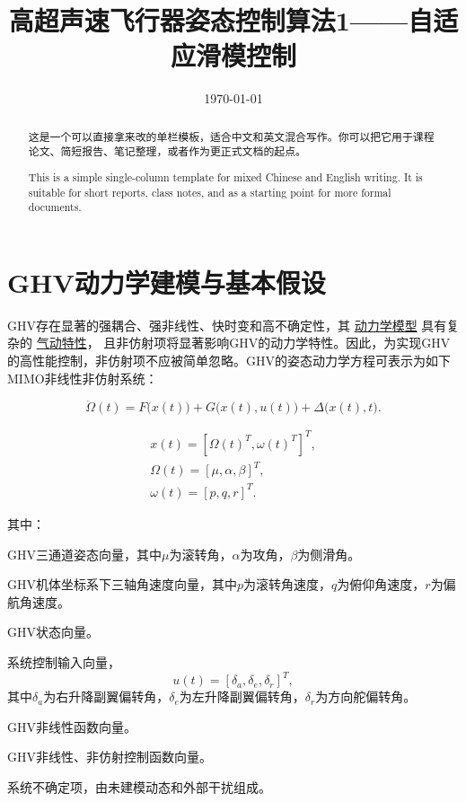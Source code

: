 \documentclass[11pt,a4paper,UTF8]{ctexart}
\title{高超声速飞行器姿态控制算法1——自适应滑模控制}
\author{}
\date{\today}
\begin{document}
\maketitle

\begin{abstract}
  这是一个可以直接拿来改的单栏模板，适合中文和英文混合写作。你可以把它用于课程论文、简短报告、笔记整理，或者作为更正式文档的起点。
  
  This is a simple single-column template for mixed Chinese and English writing. It is suitable for short reports, class notes, and as a starting point for more formal documents.
\end{abstract}
  
\tableofcontents
\newpage


\section{GHV动力学建模与基本假设}

GHV存在显著的强耦合、强非线性、快时变和高不确定性，其
\href{./docs/Hypersonic\%20vehicle\%20simulation\%20model\%20Winged-cone\%20configuration.pdf}{动力学模型}
具有复杂的
\href{./docs/Development\%20of\%20an\%20Aerodynamic\%20Database\%20for\%20a\%20generic\%20Hypersonic\%20Air\%20Vehicle.pdf}{气动特性}，
且非仿射项将显著影响GHV的动力学特性。因此，为实现GHV的高性能控制，非仿射项不应被简单忽略。GHV的姿态动力学方程可表示为如下MIMO非线性非仿射系统：

\begin{equation}
  \ddot{\Omega}(t)
  =F\bigl(x(t)\bigr)+G\bigl(x(t),u(t)\bigr)+\Delta\bigl(x(t),t\bigr).
\end{equation}

\begin{equation}
\begin{gathered}
  x(t)=\left[\Omega(t)^{T},\omega(t)^{T}\right]^{T},\\
  \Omega(t)=\left[\mu,\alpha,\beta\right]^{T},\\
  \omega(t)=\left[p,q,r\right]^{T}.
\end{gathered}
\end{equation}

其中：

\begin{description}[style=nextline,leftmargin=3.6em,labelsep=0.8em]
  \item[$\Omega(t)$] GHV三通道姿态向量，其中$\mu$为滚转角，$\alpha$为攻角，$\beta$为侧滑角。
  \item[$\omega(t)$] GHV机体坐标系下三轴角速度向量，其中$p$为滚转角速度，$q$为俯仰角速度，$r$为偏航角速度。
  \item[$x(t)$] GHV状态向量。
  \item[$u(t)$] 系统控制输入向量，
  \[
    u(t)=\left[\delta_a,\delta_e,\delta_r\right]^T,
  \]
  其中$\delta_a$为右升降副翼偏转角，$\delta_e$为左升降副翼偏转角，$\delta_r$为方向舵偏转角。
  \item[$F\bigl(x(t)\bigr)$] GHV非线性函数向量。
  \item[$G\bigl(x(t),u(t)\bigr)$] GHV非线性、非仿射控制函数向量。
  \item[$\Delta\bigl(x(t),t\bigr)$] 系统不确定项，由未建模动态和外部干扰组成。
\end{description}
\end{document}
